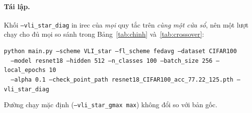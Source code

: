 \documentclass[11pt,a4paper]{article}
\theoremstyle{remark}
\newcommand{\code}[1]{\texttt{\small #1}}
\begin{document}
\paragraph{Tái lập.} Khối \code{--vli\_star\_diag} in irec của \emph{mọi} quy
tắc trên \emph{cùng một cửa sổ}, nên một lượt chạy cho đủ mọi so sánh trong
Bảng~\ref{tab:chinh} và~\ref{tab:crossover}:
\begin{center}
\code{python main.py --scheme VLI\_star --fl\_scheme fedavg --dataset CIFAR100} \\
\code{\ \ --model resnet18 --hidden 512 --n\_classes 100 --batch\_size 256 --local\_epochs 10} \\
\code{\ \ --alpha 0.1 --check\_point\_path resnet18\_CIFAR100\_acc\_77.22\_125.pth --vli\_star\_diag}
\end{center}
Đường chạy mặc định (\code{--vli\_star\_gmax max}) không đổi so với bản gốc.
\end{document}
